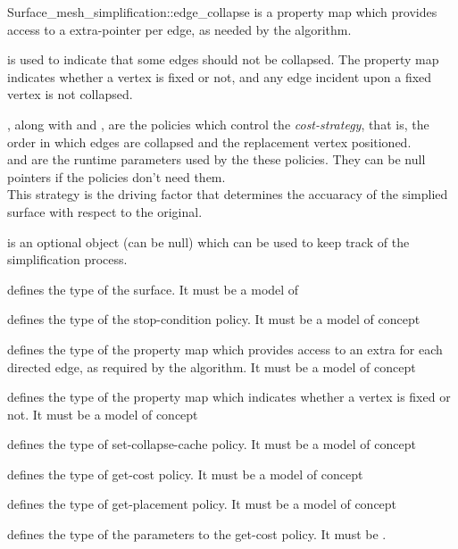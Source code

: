 \begin{ccRefFunction}{Surface_mesh_simplification::edge_collapse}
 is a property map which provides access
to a  extra-pointer per edge, as needed by the algorithm.

 is used to indicate that some edges should not be
collapsed. The property map indicates whether a vertex is fixed or not,
and any edge incident upon a fixed vertex is not collapsed.

, along with  and ,
are the policies which control the {\em cost-strategy}, that is, 
the order in which edges are collapsed and the replacement vertex positioned.\\
 and  are the runtime 
parameters used by the these policies. They can be null pointers
if the policies don't need them.\\
This strategy is the driving factor that determines the accuaracy of the
simplied surface with respect to the original.

 is an optional object (can be null) which can be used
to keep track of the simplification process.


 defines the type of the surface.
It must be a model of 

 defines the type of the stop-condition policy.
It must be a model of  concept

 defines the type of the property map which 
provides access to an extra  for each directed edge,
as required by the algorithm.
It must be a model of  concept

 defines the type of the property map which 
indicates whether a vertex is fixed or not.
It must be a model of  concept

 defines the type of set-collapse-cache policy.
It must be a model of  concept

 defines the type of get-cost policy.
It must be a model of  concept

 defines the type of get-placement policy.
It must be a model of  concept

 defines the type of the parameters to the get-cost policy.
It must be .


\end{ccRefFunction}
